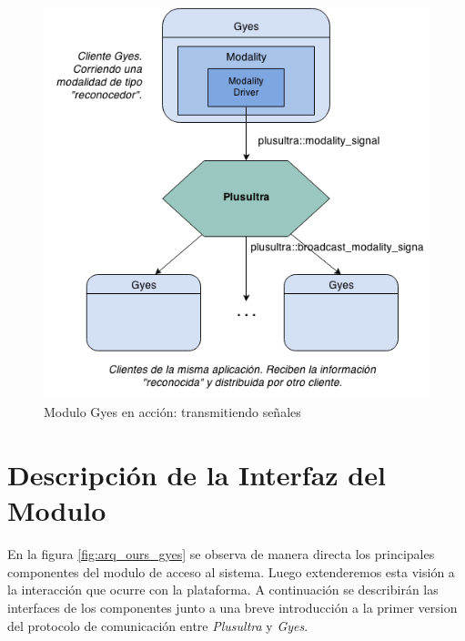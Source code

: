 \begin{center}
  \begin{figure}[h]
    \includegraphics[scale=0.7]{gfx/gyes_action}
    \caption{Modulo Gyes en acción: transmitiendo señales}
    \label{fig:arq_ours_gyes_action}
  \end{figure}
\end{center}


\section{Descripción de la Interfaz del Modulo} \label{sec:enlace_api}
En la figura \ref{fig:arq_ours_gyes} se observa de manera directa los principales componentes del modulo de acceso al sistema. Luego extenderemos esta visión a la interacción que ocurre con la plataforma.
A continuación se describirán las interfaces de los componentes junto a una breve introducción a la primer version del protocolo de comunicación entre \emph{Plusultra} y \emph{Gyes}.

